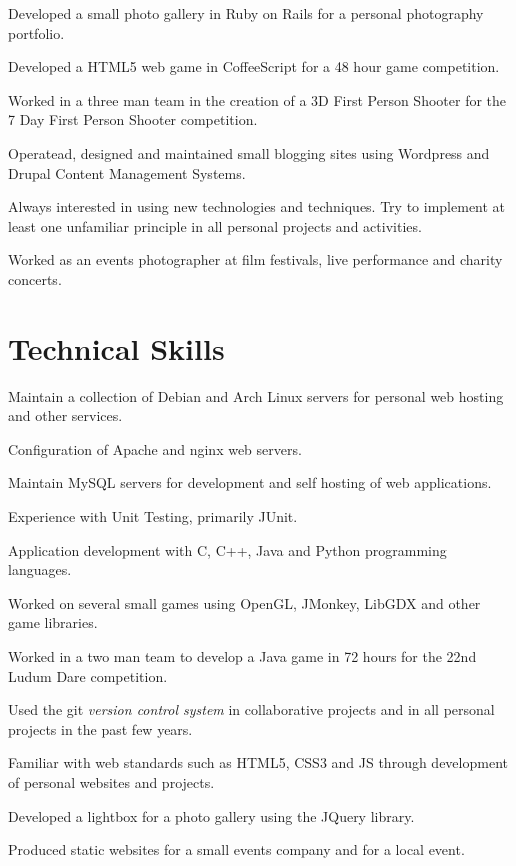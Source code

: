 \documentclass[11pt,a4paper]{article}
\renewenvironment{itemize}{
  \begin{list}{}{
    \setlength{\leftmargin}{1em}
    \setlength{\itemsep}{0.25em}
    \setlength{\parskip}{0pt}
    \setlength{\parsep}{0.25em}
    \renewcommand{\labelitemi}{$\bullet$}
  }
}{
  \end{list}
}
\begin{document}
\begin{itemize}
    \item Developed a small photo gallery in Ruby on Rails for a personal
        photography portfolio.
    \item Developed a HTML5 web game in CoffeeScript for a 48 hour game
        competition.
    \item Worked in a three man team in the creation of a 3D First Person Shooter
        for the 7 Day First Person Shooter competition.
    \item Operatead, designed and maintained small blogging sites using
        Wordpress and Drupal Content Management Systems.
    \item Always interested in using new technologies and techniques. Try to
        implement at least one unfamiliar principle in all personal projects and
        activities.
    \item Worked as an events photographer at film festivals, live
        performance and charity concerts.
\end{itemize}

\section*{Technical Skills}


\begin{itemize}
    \item Maintain a collection of Debian and Arch Linux servers for personal web hosting and other services.
    \item Configuration of Apache and nginx web servers.
    \item Maintain MySQL servers for development and self hosting of web applications.
    \item Experience with Unit Testing, primarily JUnit.
    \item Application development with C, C++, Java and Python programming languages.
    \item Worked on several small games using OpenGL, JMonkey, LibGDX and other game libraries.
    \item Worked in a  two man team to develop a Java game in 72 hours for the
        22nd Ludum Dare competition.
    \item Used the git \emph{version control system} in collaborative projects
        and in all personal projects in the past few years.
    \item Familiar with web standards such as HTML5, CSS3 and JS through development of personal websites and projects.
    \item Developed a lightbox for a photo gallery using the JQuery library.
    \item Produced static websites for a small events company and for a local event.
\end{itemize}
\end{document}
